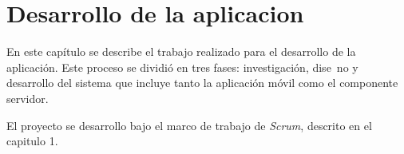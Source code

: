 \chapter{Desarrollo de la aplicacion}\label{chapter:Desarrollo de la aplicacion}

En este capítulo se describe el trabajo realizado para el desarrollo de la aplicación. Este proceso se dividió en tres fases: investigación, dise~no y desarrollo del sistema que incluye tanto la aplicación móvil como el componente servidor.

El proyecto se desarrollo bajo el marco de trabajo de \textit{Scrum}, descrito en el capitulo 1. 